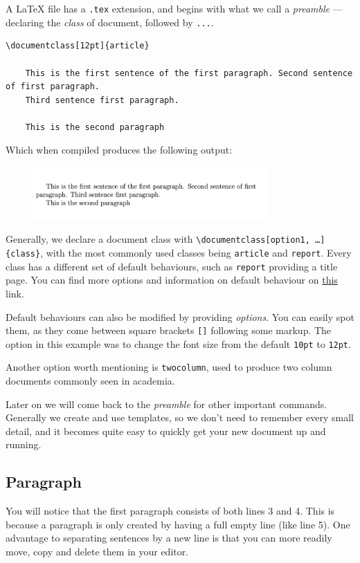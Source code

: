 A LaTeX file has a \verb|.tex| extension, and begins with what we call a \emph{preamble} --- declaring the \emph{class} of document, followed by \verb|...|.

\begin{lstlisting}[caption=\texttt{example.tex}]
\documentclass[12pt]{article}

    This is the first sentence of the first paragraph. Second sentence of first paragraph.
    Third sentence first paragraph.

    This is the second paragraph

\end{lstlisting}

Which when compiled produces the following output:

\begin{figure}[h]
    \centering
    \includegraphics[width=0.8\textwidth]{figures/chapters.png}
    \label{fig:chapters}
\end{figure}

Generally, we declare a document class with \texttt{\textbackslash documentclass[option1, \ldots]\{class\}}, with the most commonly used classes being \verb|article| and \verb|report|.
Every class has a different set of default behaviours, such as \texttt{report} providing a title page.
You can find more options and information on default behaviour on \href{https://texblog.org/2013/02/13/latex-documentclass-options-illustrated/}{this} link.

Default behaviours can also be modified by providing \emph{options}.
You can easily spot them, as they come between square brackets \verb|[]| following some markup.
The option in this example was to change the font size from the default \verb|10pt| to \verb|12pt|.

Another option worth mentioning is \verb|twocolumn|, used to produce two column documents commonly seen in academia.

Later on we will come back to the \emph{preamble} for other important commands.
Generally we create and use templates, so we don't need to remember every small detail, and it becomes quite easy to quickly get your new document up and running.

\subsection{Paragraph}
You will notice that the first paragraph consists of both lines 3 and 4.
This is because a paragraph is only created by having a full empty line (like line 5).
One advantage to separating sentences by a new line is that you can more readily move, copy and delete them in your editor.

